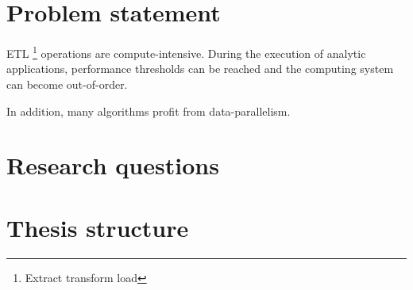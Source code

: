 


\section{Problem statement}



ETL \footnote{Extract transform load} operations are compute-intensive. During the execution of analytic applications, performance thresholds can be reached and
the computing system can become out-of-order. 

In addition, many algorithms profit from data-parallelism. %



\section{Research questions}

\section{Thesis structure}